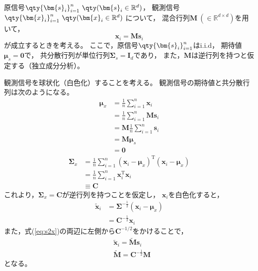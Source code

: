 \documentclass[class=jsarticle, crop=false, dvipdfmx, fleqn]{standalone}
\begin{document}
\section{}

原信号\(\qty{\bm{s}_i}_{i=1}^{n} \ \qty(\bm{s}_i \in \mathbb{R}^d)\)，
観測信号\(\qty{\bm{x}_i}_{i=1}^{n} \ \qty(\bm{x}_i \in \mathbb{R}^d)\)
について，
混合行列\(\bm{M}\ (\in \mathbb{R}^{d \times d}) \)を用いて，
\begin{equation}
    \bm{x}_i = \bm{M} \bm{s}_i
    \label{eq:s2x}
\end{equation}
が成立するときを考える。
ここで，原信号\(\qty{\bm{s}_i}_{i=1}^{n}\)はi.i.d，
期待値\(\bm{\mu}_s = \bm{0}\)で，
共分散行列が単位行列\(\bm{\Sigma}_s = \bm{I}_d\)であり，
また，\(\bm{M}\)は逆行列を持つと仮定する（独立成分分析）。

観測信号を球状化（白色化）することを考える。
観測信号の期待値と共分散行列は次のようになる。
\begin{align}
    \bm{\mu}_x
        & = \frac{1}{n} \sum_{i=1}^{n} \bm{x}_i \\
        & = \frac{1}{n} \sum_{i=1}^{n} \bm{M} \bm{s}_i \\
        & = \bm{M} \frac{1}{n} \sum_{i=1}^{n} \bm{s}_i \\
        & = \bm{M} \bm{\mu}_s \\
        & = \bm{0}
\end{align}
\begin{align}
    \bm{\Sigma}_x
        & = \frac{1}{n} \sum_{i=1}^{n} (\bm{x}_i - \bm{\mu}_x)^\mathrm{T} (\bm{x}_i - \bm{\mu}_x) \\
        & = \frac{1}{n} \sum_{i=1}^{n} \bm{x}_i^\mathrm{T} \bm{x}_i \\
        & \equiv \bm{C}
\end{align}
これより，\(\bm{\Sigma}_x = \bm{C}\)が逆行列を持つことを仮定し，
\(\bm{x}_i\)を白色化すると，
\begin{align}
    \tilde{\bm{x}}_i
        & = \bm{\Sigma}^{-\frac{1}{2}} (\bm{x}_i - \bm{\mu}_x) \\
        & = \bm{C}^{-\frac{1}{2}} \bm{x}_i
\end{align}
また，式(\ref{eq:s2x})の両辺に左側から\(\bm{C}^{-1/2}\)をかけることで，
\begin{align}
    & \tilde{\bm{x}}_i = \tilde{\bm{M}} \bm{s}_i
        \label{eq:s2x_tilde} \\
    & \tilde{\bm{M}} = \bm{C}^{-\frac{1}{2}} \bm{M}
\end{align}
となる。
\end{document}
